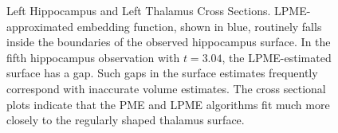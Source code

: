 \documentclass[11pt,reqno]{article}
\renewcommand{\textwidth}{180mm}
\theoremstyle{definition}
\begin{document}
\begin{figure}[h]
  \centering
  \vfill
  
  \caption{Left Hippocampus and Left Thalamus Cross Sections. LPME-approximated embedding function, shown in blue, routinely falls inside the boundaries of the observed hippocampus surface. In the fifth hippocampus observation with $t=3.04$, the LPME-estimated surface has a gap. Such gaps in the surface estimates frequently correspond with inaccurate volume estimates. The cross sectional plots indicate that the PME and LPME algorithms fit much more closely to the regularly shaped thalamus surface.}
  \label{fig:adni_cross_sections}
\end{figure}
\end{document}
